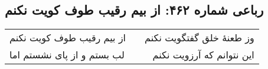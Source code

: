 \begin{center}
\section*{رباعی شماره ۴۶۲: از بیم رقیب طوف کویت نکنم}
\label{sec:sh462}
\begin{longtable}{l p{0.5cm} r}
از بیم رقیب طوف کویت نکنم
&&
وز طعنهٔ خلق گفتگویت نکنم
\\
لب بستم و از پای نشستم اما
&&
این نتوانم که آرزویت نکنم
\\
\end{longtable}
\end{center}
